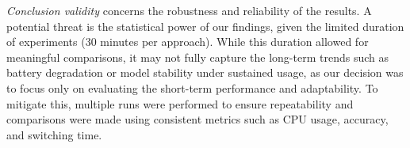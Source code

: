 \textit{Conclusion validity} concerns the robustness and reliability of the results. A potential threat is the statistical power of our findings, given the limited duration of experiments (30 minutes per approach). While this duration allowed for meaningful comparisons, it may not fully capture the long-term trends such as battery degradation or model stability under sustained usage, as our decision was to focus only on evaluating the short-term performance and adaptability. To mitigate this, multiple runs were performed to ensure repeatability and comparisons were made using consistent metrics such as CPU usage, accuracy, and switching time. 